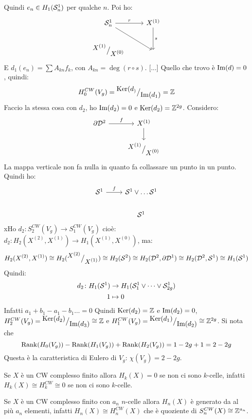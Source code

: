 Quindi $ e_n \in H_1(\mathcal{S}^{1}_n) $ per qualche $ n $. Poi ho:
\[
  \begin{tikzcd}
    \Sph{1}_n \rar{r} \arrow{dr}{} & X^{(1)} \dar{s} \\
    \quot{X^{(1)}}{X^{(0)}} & {}
  \end{tikzcd}
\]
E $ d_1(e_n) = \sum A_{kn}f_k $, con  $ A_{kn} = \deg {(r \circ s)} $.
[...]
Quello che trovo è $ \mathrm{Im}( d ) = 0 $, quindi:
\[
  H_0^{CW}(V_g) = {^{\textstyle \mathrm{Ker}( d_)}\big/_{\textstyle \mathrm{Im}( d_1 )}} = \mathbb{Z}
\]
Faccio la stessa cosa con $ d_2 $, ho $ \mathrm{Im}( d_2 ) = 0 $ e $ \mathrm{Ker}( d_2) = \mathbb{Z}^{2g} $.
Considero:
\[
  \begin{tikzcd}
    \partial \Disk{2} \rar{f} & X^{(1)} \dar  \\
    {} & \quot{X^{(1)}}{X^{(0)}}
  \end{tikzcd}
\]
La mappa verticale non fa nulla in quanto fa collassare un punto in un punto.
Quindi ho:
\[
  \begin{tikzcd}
    \Sph{1} \rar{f} & \Sph{1} \vee \dots \Sph{1} \\
    {} & \Sph{1}
  \end{tikzcd}
\]
xHo $ d_2 \colon S^{CW}_2(V_g) \to S_1^{CW}(V_g) $ cioè:
$ d_2 \colon H_2(X^{(2)}, X^{(1)}) \to H_1(X^{(1)}, X^{(0)}) $,
ma:
\[
  H_2(X^{(2)}, X^{(1)}) \cong H_2({^{\textstyle X^{(2)}}\big/_{\textstyle X^{(1)}}}) \cong H_2(\mathcal{S}^{2}) \cong H_2(\mathcal{D}^{2}, \partial \mathcal{D}^{1})
  \cong H_2(\mathcal{D}^{2}, \mathcal{S}^{1}) \cong H_1(\mathcal{S}^{1})
\]
Quindi:
\begin{align*}
  d_2 \colon H_1(\mathcal{S}^{1}) & \to H_1(\mathcal{S}^{1}_1 \vee \dots \vee \mathcal{S}^{1}_{2g}) \\
  1 & \mapsto 0
\end{align*}
Infatti $ a_1 + b_1 - a_1 - b_1 \dots = 0$
Quindi $ \mathrm{Ker}( d_2) = \mathbb{Z} $ e $ \mathrm{Im}( d_2 ) = 0 $,
$ H_2^{CW}(V_g) = {^{\textstyle \mathrm{Ker}( d_2)}\big/_{\textstyle \mathrm{Im}( d_3 )}} \cong \mathbb{Z} $ e
$ H_1^{CW}(V_g) = {^{\textstyle \mathrm{Ker}( d_1)}\big/_{\textstyle \mathrm{Im}( d_2 )}} \cong \mathbb{Z}^{2g} $.
Si nota che
\[
  \mathrm{Rank}( H_0(V_g) ) - \mathrm{Rank}( H_1(V_g) ) + \mathrm{Rank}( H_2(V_g) ) = 1 - 2g + 1 = 2 - 2g
\]
Questa è la caratteristica di Eulero di $ V_g $: $ \chi(V_g) = 2 - 2g $.

\begin{osservation}
  Se $ X $ è un CW complesso finito allora $ H_k(X) = 0 $ se non ci sono $ k $-celle,
  infatti $ H_k(X) \cong H_k^{CW} \cong 0 $ se non ci sono $ k $-celle.
\end{osservation}

\begin{osservation}
  Se $ X $ è un CW complesso finito con $ a_n $ $ n $-celle allora $ H_n(X) $ è
  generato da al più $ a_n $ elementi, infatti $ H_n(X) \cong H_n^{CW}(X) $ che è
  quoziente di $ S_n^{CW}(X) \cong \mathbb{Z}^{a_n} $.
\end{osservation}

